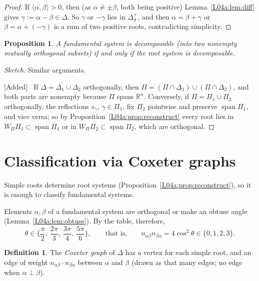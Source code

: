 \documentclass[11pt,openany]{book}
\theoremstyle{plain}
\newtheorem{proposition}[theorem]{Proposition}
\theoremstyle{definition}
\newtheorem{definition}[theorem]{Definition}
\theoremstyle{remark}
\newcommand{\added}[1]{{\color{addcol}#1}}
\newenvironment{addedblock}{\par\color{addcol}\noindent\textsf{\small[Added]}\ }{\par}
\newcommand{\R}{\mathbb{R}}
\newcommand{\ip}[2]{\langle #1, #2\rangle}
\begin{document}
\begin{proof}
If $\ip{\alpha}{\beta}>0$, then \added{(as $\alpha\neq\pm\beta$, both being positive)}
Lemma~\ref{L04a:lem:diff} gives $\gamma:=\alpha-\beta\in\Delta$. So $\gamma$ or $-\gamma$ lies in
$\Delta_d^+$, and then $\alpha=\beta+\gamma$ or $\beta=\alpha+(-\gamma)$ is a sum of two positive roots,
contradicting simplicity.
\end{proof}

\begin{proposition}\label{L04a:prop:decomp}
A fundamental system is decomposable \added{(into two nonempty mutually orthogonal subsets)} if and only
if the root system is decomposable.
\end{proposition}

\begin{proof}[Sketch]
Similar arguments.
\begin{addedblock}
If $\Delta=\Delta_1\cup\Delta_2$ orthogonally, then $\Pi=(\Pi\cap\Delta_1)\cup(\Pi\cap\Delta_2)$, and
both parts are nonempty because $\Pi$ spans $\R^n$. Conversely, if $\Pi=\Pi_1\cup\Pi_2$ orthogonally,
the reflections $s_\gamma$, $\gamma\in\Pi_1$, fix $\Pi_2$ pointwise and preserve
$\operatorname{span}\Pi_1$, and vice versa; so by
Proposition~\ref{L04a:prop:reconstruct} every root lies in $W_\Pi\Pi_1\subset\operatorname{span}\Pi_1$ or
in $W_\Pi\Pi_2\subset\operatorname{span}\Pi_2$, which are orthogonal.
\end{addedblock}
\end{proof}

\section{Classification via Coxeter graphs}
\label{L04a:sec:4.4}

Simple roots determine root systems (Proposition~\ref{L04a:prop:reconstruct}), so it is enough to
classify fundamental systems.

Elements $\alpha,\beta$ of a fundamental system are orthogonal or make an obtuse angle
(Lemma~\ref{L04a:lem:obtuse}). By the table, therefore,
\[
  \theta \in \Big\{\frac\pi2,\ \frac{2\pi}3,\ \frac{3\pi}4,\ \frac{5\pi}6\Big\},
  \qquad\text{that is,}\qquad n_{\alpha\beta}n_{\beta\alpha}=4\cos^2\theta\in\{0,1,2,3\}.
\]

\begin{definition}\label{L04a:def:coxeter}
The \emph{Coxeter graph} of $\Delta$ has a vertex for each simple root, and an edge of weight
$n_{\alpha\beta}\cdot n_{\beta\alpha}$ between $\alpha$ and $\beta$ \added{(drawn as that many edges;
no edge when $\alpha\perp\beta$)}.
\end{definition}
\end{document}
